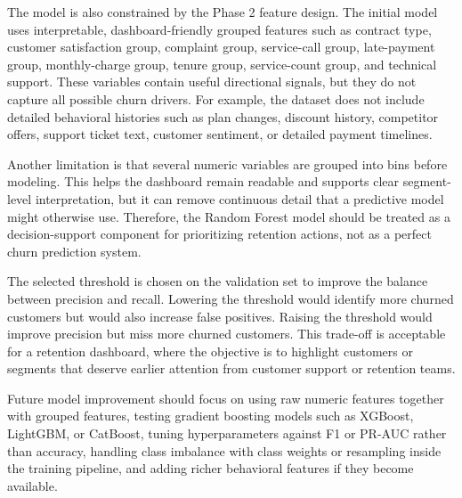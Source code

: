 The model is also constrained by the Phase 2 feature design. The initial model
uses interpretable, dashboard-friendly grouped features such as contract type,
customer satisfaction group, complaint group, service-call group, late-payment
group, monthly-charge group, tenure group, service-count group, and technical
support. These variables contain useful directional signals, but they do not
capture all possible churn drivers. For example, the dataset does not include
detailed behavioral histories such as plan changes, discount history, competitor
offers, support ticket text, customer sentiment, or detailed payment timelines.

Another limitation is that several numeric variables are grouped into bins before
modeling. This helps the dashboard remain readable and supports clear
segment-level interpretation, but it can remove continuous detail that a
predictive model might otherwise use. Therefore, the Random Forest model should
be treated as a decision-support component for prioritizing retention actions,
not as a perfect churn prediction system.

The selected threshold is chosen on the validation set to improve the balance
between precision and recall. Lowering the threshold would identify more churned
customers but would also increase false positives. Raising the threshold would
improve precision but miss more churned customers. This trade-off is acceptable
for a retention dashboard, where the objective is to highlight customers or
segments that deserve earlier attention from customer support or retention
teams.

Future model improvement should focus on using raw numeric features together
with grouped features, testing gradient boosting models such as XGBoost,
LightGBM, or CatBoost, tuning hyperparameters against F1 or PR-AUC rather than
accuracy, handling class imbalance with class weights or resampling inside the
training pipeline, and adding richer behavioral features if they become
available.
